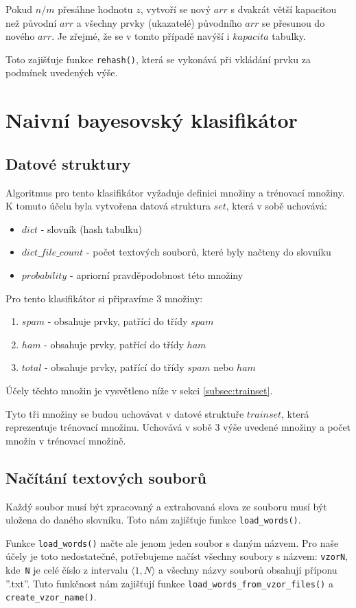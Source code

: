 \documentclass[12pt]{report}
\begin{document}
Pokud $n/m$ přesáhne hodnotu $z$, vytvoří se nový $arr$ s dvakrát větší kapacitou než původní $arr$ a všechny prvky (ukazatelé) původního $arr$ se přesunou do nového $arr$. Je zřejmé, že se v tomto případě navýší i $kapacita$ tabulky.

Toto zajišťuje funkce \verb|rehash()|, která se vykonává při vkládání prvku za podmínek uvedených výše.
\section{Naivní bayesovský klasifikátor}
\subsection{Datové struktury}
Algoritmus pro tento klasifikátor vyžaduje definici množiny a trénovací množiny. K tomuto účelu byla vytvořena datová struktura $set$, která v sobě uchovává:
\begin{itemize}
    \item $dict$ - slovník (hash tabulku)
    \item $dict\_file\_count$ - počet textových souborů, které byly načteny do slovníku
    \item $probability$ - apriorní pravděpodobnost této množiny
\end{itemize}
Pro tento klasifikátor si připravíme 3 množiny:
\begin{enumerate}
    \item $spam$ - obsahuje prvky, patřící do třídy $spam$
    \item $ham$ - obsahuje prvky, patřící do třídy $ham$
    \item $total$ - obsahuje prvky, patřící do třídy $spam$ nebo $ham$
\end{enumerate}
Účely těchto množin je vysvětleno níže v sekci \ref{subsec:trainset}.

Tyto tři množiny se budou uchovávat v datové struktuře $trainset$, která reprezentuje trénovací množinu.
Uchovává v sobě 3 výše uvedené množiny a počet množin v trénovací množině.

\subsection{Načítání textových souborů}
\label{subsec:loadingfile}
Každý soubor musí být zpracovaný a extrahovaná slova ze souboru musí být uložena do daného slovníku. Toto nám zajišťuje funkce \verb|load_words()|.

Funkce \verb|load_words()| načte ale jenom jeden soubor s daným názvem. Pro naše účely je toto nedostatečné, potřebujeme načíst všechny soubory s názvem: \verb|vzorN|, kde~\verb|N| je celé číslo z intervalu $\langle1,N\rangle$ a všechny názvy souborů obsahují příponu ''.txt''. 
Tuto funkčnost nám zajišťují funkce \verb|load_words_from_vzor_files()| a \verb|create_vzor_name()|.
\end{document}
